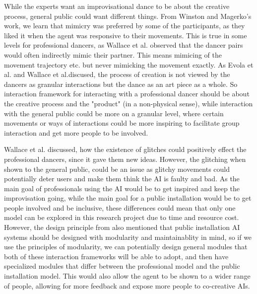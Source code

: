 \documentclass[final,5p,times,twocolumn,authoryear]{article}
\begin{document}
While the experts want an improvisational dance to be about the creative
process, general public could want different things. From Winston and
Magerko's work, we learn that mimicry was preferred by some of the
participants, as they liked it when the agent was responsive to their
movements. This is true in some levels for professional dancers, as
Wallace et al. observed that the dancer pairs would often indirectly
mimic their partner. This means mimicing of the movement trajectory etc.
but never mimicking the movement exactly. As Evola et al. and Wallace et
al.discused, the process of creation is not viewed by the dancers as
granular interactions but the dance as an art piece as a whole. So
interaction framework for interacting with a professional dancer should
be about the creative process and the "product" (in a non-physical
sense), while interaction with the general public could be more on a
granular level, where certain movements or ways of interactions could be more
inspiring to facilitate group interaction and get more people to be involved.
 
Wallace et al. discussed, how the existence of glitches could positively
effect the professional dancers, since it gave them new ideas. However,
the glitching when shown to the general public, could be an issue as
glitchy movements could potentially deter users and make them think the
AI is faulty and bad. As the main goal of professionals using the AI
would be to get inspired and keep the improvisation going, while the
main goal for a public installation would be to get people involved and
be inclusive, these differences could mean that only one model can be
explored in this research project due to time and resource cost.
However, the design principle from \cite{Long2019} also mentioned that
public installation AI systems should be designed with modularity and
maintainablity in mind, so if we use the principles of modularity, we
can potentially design general modules that both of these interaction
frameworks will be able to adopt, and then have specialized modules that
differ between the professional model and the public installation model.
This would also allow the agent to be shown to a wider range of people,
allowing for more feedback and expose more people to co-creative AIs.
\end{document}
